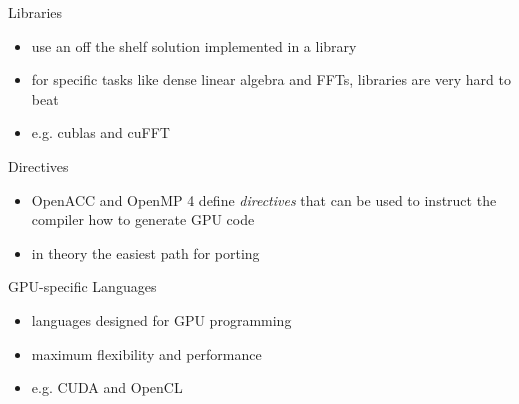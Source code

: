 \documentclass[aspectratio=43]{beamer}
\begin{document}
\begin{frame}[fragile]{}
    \begin{info}{Libraries}
        \begin{itemize}
            \item use an off the shelf solution implemented in a library
            \item for specific tasks like dense linear algebra and FFTs, libraries are very hard to beat
            \item e.g. cublas and cuFFT
        \end{itemize}
    \end{info}

    \begin{info}{Directives}
        \begin{itemize}
            \item OpenACC and OpenMP 4 define \emph{directives} that can be used to instruct the compiler how to generate GPU code
            \item in theory the easiest path for porting
        \end{itemize}
    \end{info}

    \begin{info}{GPU-specific Languages}
        \begin{itemize}
            \item languages designed for GPU programming
            \item maximum flexibility and performance
            \item e.g. CUDA and OpenCL
        \end{itemize}
    \end{info}
\end{frame}
\end{document}
